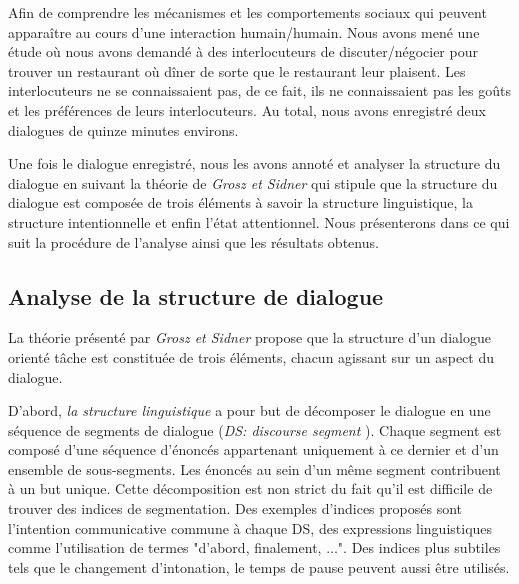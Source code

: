 		
		Afin de comprendre les mécanismes et  les comportements sociaux qui peuvent apparaître au cours d'une interaction humain/humain.
		Nous avons mené une étude où nous avons demandé à des interlocuteurs de discuter/négocier pour trouver un restaurant où dîner de sorte que le restaurant leur plaisent.
		Les interlocuteurs ne se connaissaient pas, de ce fait, ils ne connaissaient pas les goûts et les préférences de leurs interlocuteurs. Au total, nous avons enregistré deux dialogues de quinze minutes environs.
		 	
		Une fois le dialogue enregistré, nous les avons annoté et analyser la structure du dialogue en suivant la théorie de \emph{Grosz et Sidner} \cite{sidner1994artificial} qui stipule que la structure du dialogue est composée de trois éléments à savoir la structure linguistique, la structure intentionnelle et enfin l'état attentionnel.	
		Nous présenterons dans ce qui suit la procédure de l'analyse ainsi que les résultats obtenus. 
		
		\subsection{Analyse de la structure de dialogue}  
			La théorie présenté par \emph{Grosz et Sidner} propose que la structure d'un dialogue orienté tâche est constituée de trois éléments, chacun agissant sur un aspect du dialogue. 
			
			D'abord, \emph{la structure linguistique} a pour but de décomposer le dialogue en une séquence de segments de dialogue (\textit{DS: discourse segment }). Chaque segment est composé d'une séquence d'énoncés appartenant uniquement à ce dernier et d'un ensemble de sous-segments. Les énoncés au sein d'un même segment contribuent à un but unique. Cette décomposition est non strict du fait qu'il est difficile de trouver des indices de segmentation. Des exemples d'indices proposés sont l'intention communicative commune à chaque DS, des expressions  linguistiques comme l'utilisation de termes "d'abord, finalement, $\ldots$". Des indices plus subtiles tels que le changement d'intonation, le temps de pause peuvent aussi être utilisés.
			
